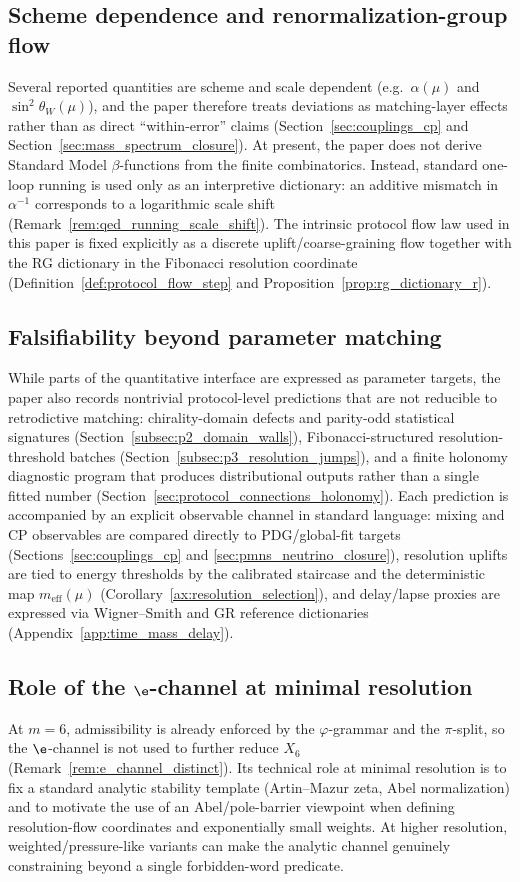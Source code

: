 \subsection{Scheme dependence and renormalization-group flow}
Several reported quantities are scheme and scale dependent (e.g.\ $\alpha(\mu)$ and $\sin^2\theta_W(\mu)$), and the paper therefore treats deviations as matching-layer effects rather than as direct ``within-error'' claims (Section~\ref{sec:couplings_cp} and Section~\ref{sec:mass_spectrum_closure}).
At present, the paper does not derive Standard Model $\beta$-functions from the finite combinatorics.
Instead, standard one-loop running is used only as an interpretive dictionary: an additive mismatch in $\alpha^{-1}$ corresponds to a logarithmic scale shift (Remark~\ref{rem:qed_running_scale_shift}).
The intrinsic protocol flow law used in this paper is fixed explicitly as a discrete uplift/coarse-graining flow together with the RG dictionary in the Fibonacci resolution coordinate (Definition~\ref{def:protocol_flow_step} and Proposition~\ref{prop:rg_dictionary_r}).

\subsection{Falsifiability beyond parameter matching}
While parts of the quantitative interface are expressed as parameter targets, the paper also records nontrivial protocol-level predictions that are not reducible to retrodictive matching:
chirality-domain defects and parity-odd statistical signatures (Section~\ref{subsec:p2_domain_walls}),
Fibonacci-structured resolution-threshold batches (Section~\ref{subsec:p3_resolution_jumps}),
and a finite holonomy diagnostic program that produces distributional outputs rather than a single fitted number (Section~\ref{sec:protocol_connections_holonomy}).
Each prediction is accompanied by an explicit observable channel in standard language: mixing and CP observables are compared directly to PDG/global-fit targets (Sections~\ref{sec:couplings_cp} and \ref{sec:pmns_neutrino_closure}), resolution uplifts are tied to energy thresholds by the calibrated staircase and the deterministic map $m_{\mathrm{eff}}(\mu)$ (Corollary~\ref{ax:resolution_selection}), and delay/lapse proxies are expressed via Wigner--Smith and GR reference dictionaries (Appendix~\ref{app:time_mass_delay}).

\subsection{Role of the \texorpdfstring{$\e$}{e}-channel at minimal resolution}
At $m=6$, admissibility is already enforced by the $\varphi$-grammar and the $\pi$-split, so the $\e$-channel is not used to further reduce $X_6$ (Remark~\ref{rem:e_channel_distinct}).
Its technical role at minimal resolution is to fix a standard analytic stability template (Artin--Mazur zeta, Abel normalization) and to motivate the use of an Abel/pole-barrier viewpoint when defining resolution-flow coordinates and exponentially small weights.
At higher resolution, weighted/pressure-like variants can make the analytic channel genuinely constraining beyond a single forbidden-word predicate.

